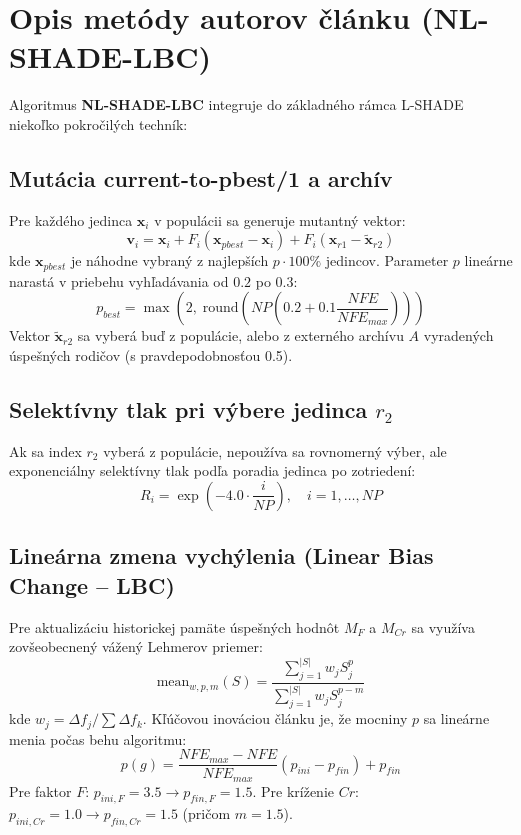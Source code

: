 \documentclass[11pt,a4paper]{article}
\begin{document}
\section{Opis metódy autorov článku (NL-SHADE-LBC)}
Algoritmus \textbf{NL-SHADE-LBC} integruje do základného rámca L-SHADE niekoľko pokročilých techník:

\subsection{Mutácia current-to-pbest/1 a archív}
Pre každého jedinca $\mathbf{x}_i$ v populácii sa generuje mutantný vektor:
\begin{equation}
\mathbf{v}_i = \mathbf{x}_i + F_i (\mathbf{x}_{pbest} - \mathbf{x}_i) + F_i (\mathbf{x}_{r1} - \tilde{\mathbf{x}}_{r2})
\end{equation}
kde $\mathbf{x}_{pbest}$ je náhodne vybraný z najlepších $p \cdot 100\%$ jedincov. Parameter $p$ lineárne narastá v priebehu vyhľadávania od $0.2$ po $0.3$:
\begin{equation}
p_{best} = \max\left(2, \; \text{round}\left(NP \left(0.2 + 0.1 \frac{NFE}{NFE_{max}}\right)\right)\right)
\end{equation}
Vektor $\tilde{\mathbf{x}}_{r2}$ sa vyberá buď z populácie, alebo z externého archívu $A$ vyradených úspešných rodičov (s pravdepodobnosťou 0.5).

\subsection{Selektívny tlak pri výbere jedinca $r_2$}
Ak sa index $r_2$ vyberá z populácie, nepoužíva sa rovnomerný výber, ale exponenciálny selektívny tlak podľa poradia jedinca po zotriedení:
\begin{equation}
R_i = \exp\left( -4.0 \cdot \frac{i}{NP} \right), \quad i = 1, \dots, NP
\end{equation}

\subsection{Lineárna zmena vychýlenia (Linear Bias Change -- LBC)}
Pre aktualizáciu historickej pamäte úspešných hodnôt $M_F$ a $M_{Cr}$ sa využíva zovšeobecnený vážený Lehmerov priemer:
\begin{equation}
\text{mean}_{w, p, m}(S) = \frac{\sum_{j=1}^{|S|} w_j S_j^p}{\sum_{j=1}^{|S|} w_j S_j^{p - m}}
\end{equation}
kde $w_j = \Delta f_j / \sum \Delta f_k$. Kľúčovou inováciou článku je, že mocniny $p$ sa lineárne menia počas behu algoritmu:
\begin{equation}
p(g) = \frac{NFE_{max} - NFE}{NFE_{max}} (p_{ini} - p_{fin}) + p_{fin}
\end{equation}
Pre faktor $F$: $p_{ini, F} = 3.5 \to p_{fin, F} = 1.5$. Pre kríženie $Cr$: $p_{ini, Cr} = 1.0 \to p_{fin, Cr} = 1.5$ (pričom $m = 1.5$).
\end{document}

